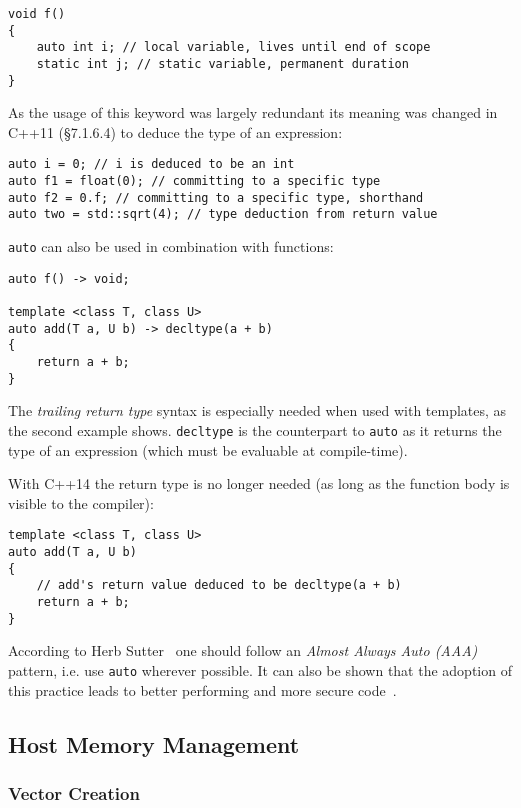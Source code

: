 \begin{lstlisting}
void f()
{
    auto int i; // local variable, lives until end of scope
    static int j; // static variable, permanent duration
}
\end{lstlisting}

As the usage of this keyword was largely redundant its meaning was changed in C++11 \cite{cpp11std}(§7.1.6.4) to deduce the type of an expression:

\begin{lstlisting}
auto i = 0; // i is deduced to be an int
auto f1 = float(0); // committing to a specific type
auto f2 = 0.f; // committing to a specific type, shorthand
auto two = std::sqrt(4); // type deduction from return value
\end{lstlisting}

\texttt{auto} can also be used in combination with functions:

\begin{lstlisting}
auto f() -> void;

template <class T, class U>
auto add(T a, U b) -> decltype(a + b)
{
    return a + b;
}
\end{lstlisting}

The \textit{trailing return type} syntax is especially needed when used with templates, as the second example shows. \texttt{decltype} is the counterpart to \texttt{auto} as it returns the type of an expression (which must be evaluable at compile-time).

With C++14 the return type is no longer needed (as long as the function body is visible to the compiler):

\begin{lstlisting}
template <class T, class U>
auto add(T a, U b)
{
    // add's return value deduced to be decltype(a + b)
    return a + b;
}
\end{lstlisting}

According to Herb Sutter~\cite{sutteraaa} one should follow an \textit{Almost Always Auto (AAA)} pattern, i.e. use \texttt{auto} wherever possible. It can also be shown that the adoption of this practice leads to better performing and more secure code~\cite{sutter_cppcon}.

\subsection{Host Memory Management}

\subsubsection{Vector Creation}


